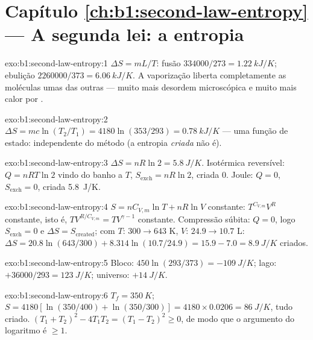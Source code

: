 \section*{Capítulo \ref{ch:b1:second-law-entropy} --- A segunda lei: a entropia}

\begin{solution}{exo:b1:second-law-entropy:1}
$\Delta S = mL/T$: fusão $334000/273 = \qty{1.22}{kJ/K}$; ebulição $2260000/
373 = \qty{6.06}{kJ/K}$. A vaporização liberta completamente as moléculas
umas das outras --- muito mais desordem microscópica e muito mais calor por
.
\end{solution}

\begin{solution}{exo:b1:second-law-entropy:2}
$\Delta S = mc\ln(T_2/T_1) = 4180\ln(353/293) = \qty{0.78}{kJ/K}$ --- uma função
de estado: independente do método (a entropia \emph{criada} não é).
\end{solution}

\begin{solution}{exo:b1:second-law-entropy:3}
$\Delta S = nR\ln2 = \qty{5.8}{J/K}$. Isotérmica reversível: $Q = nRT\ln2$
vindo do banho a $T$, $S_{\mathrm{exch}} = nR\ln2$, criada $0$. Joule:
$Q = 0$, $S_{\mathrm{exch}} = 0$, criada \qty{5.8}{J/K}.
\end{solution}

\begin{solution}{exo:b1:second-law-entropy:4}
$S = nC_{V,m}\ln T + nR\ln V$ constante: $T^{C_{V,m}}V^R$ constante, isto é,
$TV^{R/C_{V,m}} = TV^{\gamma - 1}$ constante. Compressão súbita: $Q = 0$, logo
$S_{\mathrm{exch}} = 0$ e $\Delta S = S_{\mathrm{created}}$; com $T$: $300 \to
643$ K, $V$: $24.9 \to 10.7$ L: $\Delta S = 20.8\ln(643/300) + 8.314\ln(10.7/
24.9) = 15.9 - 7.0 = \qty{+8.9}{J/K}$ criados.
\end{solution}

\begin{solution}{exo:b1:second-law-entropy:5}
Bloco: $450\ln(293/373) = \qty{-109}{J/K}$; lago: $+36000/293 = \qty{+123}{J/K}$;
universo: $+\qty{14}{J/K}$.
\end{solution}

\begin{solution}{exo:b1:second-law-entropy:6}
$T_f = \qty{350}{K}$; $S = 4180[\ln(350/400) + \ln(350/300)] = 4180 \times
0.0206 = \qty{86}{J/K}$, tudo criado. $(T_1 + T_2)^2 - 4T_1T_2 = (T_1 - T_2)^2
\geq 0$, de modo que o argumento do logaritmo é $\geq 1$.
\end{solution}

